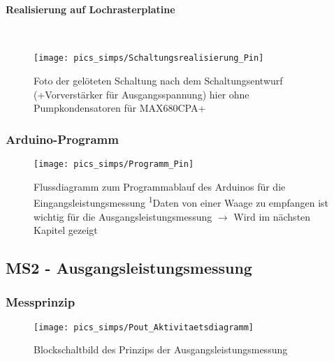 \documentclass[12pt,a4paper]{article}
\begin{document}
\paragraph{Realisierung auf Lochrasterplatine}\mbox{}\\ %
\begin{figure}[h!]
	\centering
	\texttt{[image: pics\_simps/Schaltungsrealisierung\_Pin]}
	\caption{Foto der gelöteten Schaltung nach dem Schaltungsentwurf (+Vorverstärker für Ausgangsspannung) hier ohne Pumpkondensatoren für MAX680CPA+}
\end{figure}
%
\subsubsection{Arduino-Programm}
\begin{figure}[h!]
	\centering
	\texttt{[image: pics\_simps/Programm\_Pin]}
	\caption{Flussdiagramm zum Programmablauf des Arduinos für die Eingangsleistungsmessung\vspace{0.3cm}\newline
	\textsuperscript{1}Daten von einer Waage zu empfangen ist wichtig für die Ausgangsleistungsmessung $\rightarrow$ Wird im nächsten Kapitel gezeigt}
\end{figure}
%
%
\newpage
\subsection{MS2 - Ausgangsleistungsmessung}
\subsubsection{Messprinzip}
\begin{figure}[h!]
	\centering
	\texttt{[image: pics\_simps/Pout\_Aktivitaetsdiagramm]}
	\caption{Blockschaltbild des Prinzips der Ausgangsleistungsmessung}
\end{figure}
%
%
\newpage
\end{document}
